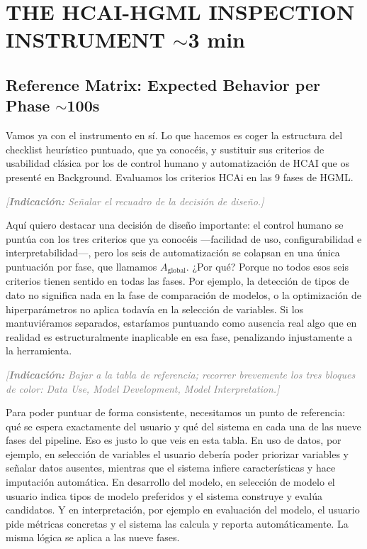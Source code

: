 \documentclass[11pt,a4paper]{article}
\newcommand{\indicacion}[1]{%
    \par\medskip
    \noindent\textcolor{gray}{\textit{[\textbf{Indicaci\'on:} #1]}}
    \par\medskip
}
\begin{document}
\section{THE HCAI-HGML INSPECTION INSTRUMENT \hfill \normalfont\small $\sim$3 min}

\subsection{Reference Matrix: Expected Behavior per Phase \hfill \normalfont\small $\sim$100s}
Vamos ya con el instrumento en sí. Lo que hacemos es coger la estructura del checklist heurístico puntuado, que ya conocéis, y sustituir sus criterios de usabilidad clásica por los de control humano y automatización de HCAI que os presenté en Background. Evaluamos los criterios HCAi en las 9 fases de HGML.

\indicacion{Señalar el recuadro de la decisión de diseño.}
Aquí quiero destacar una decisión de diseño importante: el control humano se puntúa con los tres criterios que ya conocéis —facilidad de uso, configurabilidad e interpretabilidad—, pero los seis de automatización se colapsan en una única puntuación por fase, que llamamos $A_{\text{global}}$. ¿Por qué? Porque no todos esos seis criterios tienen sentido en todas las fases. Por ejemplo, la detección de tipos de dato no significa nada en la fase de comparación de modelos, o la optimización de hiperparámetros no aplica todavía en la selección de variables. Si los mantuviéramos separados, estaríamos puntuando como ausencia real algo que en realidad es estructuralmente inaplicable en esa fase, penalizando injustamente a la herramienta.

\indicacion{Bajar a la tabla de referencia; recorrer brevemente los tres bloques de color: Data Use, Model Development, Model Interpretation.}
Para poder puntuar de forma consistente, necesitamos un punto de referencia: qué se espera exactamente del usuario y qué del sistema en cada una de las nueve fases del pipeline. Eso es justo lo que veis en esta tabla. En uso de datos, por ejemplo, en selección de variables el usuario debería poder priorizar variables y señalar datos ausentes, mientras que el sistema infiere características y hace imputación automática. En desarrollo del modelo, en selección de modelo el usuario indica tipos de modelo preferidos y el sistema construye y evalúa candidatos. Y en interpretación, por ejemplo en evaluación del modelo, el usuario pide métricas concretas y el sistema las calcula y reporta automáticamente. La misma lógica se aplica a las nueve fases.
\end{document}
